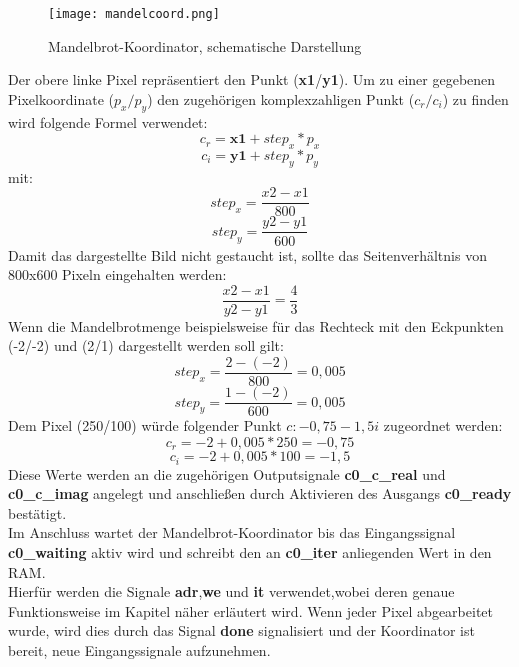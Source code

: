\documentclass[a4paper,12pt,onesided]{report}
\begin{document}
\begin{figure}[H]
	\centering
	\texttt{[image: mandelcoord.png]}
	\caption{Mandelbrot-Koordinator, schematische Darstellung}
	\label{fig:mandelcoordpixels}
\end{figure}
Der obere linke Pixel repräsentiert den Punkt (\textbf{x1}/\textbf{y1}).
Um zu einer gegebenen Pixelkoordinate ($p_x/p_y$) den zugehörigen komplexzahligen Punkt ($c_r/c_i$) zu finden wird folgende Formel verwendet:
\[c_r = \mathbf{x1} + step_x * p_x\] 
\[c_i = \mathbf{y1} + step_y * p_y\]
mit:
\[step_x = \frac{x2-x1}{800}\]
\[step_y = \frac{y2-y1}{600}\]
Damit das dargestellte Bild nicht gestaucht ist, sollte das Seitenverhältnis von 800x600 Pixeln eingehalten werden:
\[\frac{x2-x1}{y2-y1}=\frac{4}{3}\]
Wenn die Mandelbrotmenge beispielsweise für das Rechteck mit den Eckpunkten (-2/-2) und (2/1) dargestellt werden soll gilt:
\[step_x = \frac{2-(-2)}{800} = 0,005\]
\[step_y = \frac{1-(-2)}{600} = 0,005\]
Dem Pixel (250/100) würde folgender Punkt $c: -0,75 -1,5i$ zugeordnet werden:
\[c_r = -2 + 0,005 * 250 = -0,75\] 
\[c_i = -2 + 0,005 * 100 = -1,5\]
Diese Werte werden an die zugehörigen Outputsignale \textbf{c0\_c\_real} und \textbf{c0\_c\_imag} angelegt und anschließen durch Aktivieren des Ausgangs \textbf{c0\_ready} bestätigt.\\
Im Anschluss wartet der Mandelbrot-Koordinator bis das Eingangssignal \textbf{c0\_waiting} aktiv wird und schreibt den an \textbf{c0\_iter} anliegenden Wert in den RAM.\\
Hierfür werden die Signale \textbf{adr},\textbf{we} und \textbf{it} verwendet,wobei deren genaue Funktionsweise im Kapitel
näher erläutert wird.
Wenn jeder Pixel abgearbeitet wurde, wird dies durch das Signal \textbf{done} signalisiert und der Koordinator ist bereit, neue Eingangssignale aufzunehmen.\\
\end{document}
